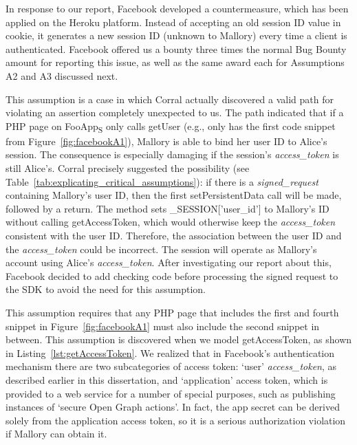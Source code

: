 In response to our report, Facebook developed a countermeasure, which has been applied on the Heroku platform.  Instead of accepting an old session ID value in cookie, it generates a new session ID (unknown to Mallory) every time a client is authenticated.  Facebook offered us a bounty three times the normal Bug Bounty amount for reporting this issue, as well as the same award each for Assumptions A2 and A3 discussed next. 

 This assumption is a case in which Corral actually discovered a valid path for violating an assertion completely unexpected to us.  The path indicated that if a PHP page on FooApp\textsubscript{S} only calls getUser (e.g., only has the first code snippet from Figure~\ref{fig:facebookA1}), Mallory is able to bind her user ID to Alice's session.  The consequence is especially damaging if the session's \emph{access\_token} is still Alice's.  Corral precisely suggested the possibility (see Table~\ref{tab:explicating_critical_assumptions}): if there is a \emph{signed\_request} containing Mallory's user ID, then the first setPersistentData call will be made, followed by a return.  The method sets \_SESSION['user\_id'] to Mallory's ID without calling getAccessToken, which would otherwise keep the \emph{access\_token} consistent with the user ID.  Therefore, the association between the user ID and the \emph{access\_token} could be incorrect. The session will operate as Mallory's account using Alice's \emph{access\_token}.  After investigating our report about this, Facebook decided to add checking code before processing the signed request to the SDK to avoid the need for this assumption.

 This assumption requires that any PHP page that includes the first and fourth snippet in Figure~\ref{fig:facebookA1} must also include the second snippet in between.  This assumption is discovered when we model getAccessToken, as shown in Listing~\ref{lst:getAccessToken}.  We realized that in Facebook's authentication mechanism there are two subcategories of access token: `user' \emph{access\_token}, as described earlier in this dissertation, and `application' access token, which is provided to a web service for a number of special purposes, such as publishing instances of `secure Open Graph actions'.  In fact, the app secret can be derived solely from the application access token, so it is a serious authorization violation if Mallory can obtain it. 



